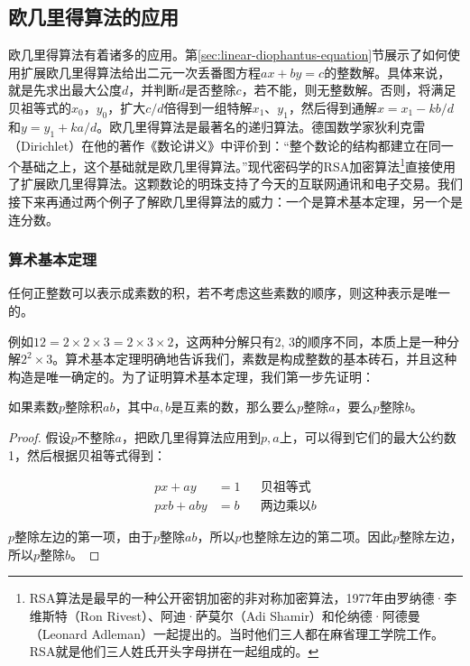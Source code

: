 \documentclass[b5paper]{ctexart}
\begin{document}
\subsection{欧几里得算法的应用}

欧几里得算法有着诸多的应用。第\ref{sec:linear-diophantus-equation}节展示了如何使用扩展欧几里得算法给出二元一次丢番图方程$ax + by = c$的整数解。具体来说，就是先求出最大公度$d$，并判断$d$是否整除$c$，若不能，则无整数解。否则，将满足贝祖等式的$x_0$，$y_0$，扩大$c/d$倍得到一组特解$x_1$、$y_1$，然后得到通解$x = x_1 - k b / d$和$y = y_1 + k a / d$。欧几里得算法是最著名的递归算法。德国数学家狄利克雷（Dirichlet）在他的著作《数论讲义》中评价到：“整个数论的结构都建立在同一个基础之上，这个基础就是欧几里得算法。”现代密码学的RSA加密算法\footnote{RSA算法是最早的一种公开密钥加密的非对称加密算法，1977年由罗纳德·李维斯特（Ron Rivest）、阿迪·萨莫尔（Adi Shamir）和伦纳德·阿德曼（Leonard Adleman）一起提出的。当时他们三人都在麻省理工学院工作。RSA就是他们三人姓氏开头字母拼在一起组成的。}直接使用了扩展欧几里得算法。这颗数论的明珠支持了今天的互联网通讯和电子交易。我们接下来再通过两个例子了解欧几里得算法的威力：一个是算术基本定理，另一个是连分数。

\subsubsection{算术基本定理}

\begin{theorem}[算术基本定理]
任何正整数可以表示成素数的积，若不考虑这些素数的顺序，则这种表示是唯一的。
\end{theorem}

例如$12 = 2 \times 2 \times 3 = 2 \times 3 \times 2$，这两种分解只有2, 3的顺序不同，本质上是一种分解$2^2 \times 3$。算术基本定理明确地告诉我们，素数是构成整数的基本砖石，并且这种构造是唯一确定的。为了证明算术基本定理，我们第一步先证明：

\begin{lemma}[欧几里得]
如果素数$p$整除积$ab$，其中$a, b$是互素的数，那么要么$p$整除$a$，要么$p$整除$b$。
\end{lemma}

\begin{proof}
假设$p$不整除$a$，把欧几里得算法应用到$p, a$上，可以得到它们的最大公约数1，然后根据贝祖等式得到：

\begin{align*}
px + ay &= 1 && \text{贝祖等式} \\
pxb + aby & = b && \text{两边乘以}b
\end{align*}

$p$整除左边的第一项，由于$p$整除$ab$，所以$p$也整除左边的第二项。因此$p$整除左边，所以$p$整除$b$。
\end{proof}
\end{document}

